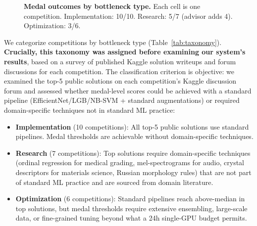 \documentclass{article}
\begin{document}
\begin{figure}[t]
    \caption{\textbf{Medal outcomes by bottleneck type.} Each cell is one competition. Implementation: 10/10. Research: 5/7 (advisor adds 4). Optimization: 3/6.}
    \label{fig:heatmap}
\end{figure}

We categorize competitions by bottleneck type (Table~\ref{tab:taxonomy}). \textbf{Crucially, this taxonomy was assigned before examining our system's results}, based on a survey of published Kaggle solution writeups and forum discussions for each competition. The classification criterion is objective: we examined the top-5 public solutions on each competition's Kaggle discussion forum and assessed whether medal-level scores could be achieved with a standard pipeline (EfficientNet/LGB/NB-SVM + standard augmentations) or required domain-specific techniques not in standard ML practice:
\begin{itemize}[leftmargin=1.5em,itemsep=1pt]
    \item \textbf{Implementation} (10 competitions): All top-5 public solutions use standard pipelines. Medal thresholds are achievable without domain-specific techniques.
    \item \textbf{Research} (7 competitions): Top solutions require domain-specific techniques (ordinal regression for medical grading, mel-spectrograms for audio, crystal descriptors for materials science, Russian morphology rules) that are not part of standard ML practice and are sourced from domain literature.
    \item \textbf{Optimization} (6 competitions): Standard pipelines reach above-median in top solutions, but medal thresholds require extensive ensembling, large-scale data, or fine-grained tuning beyond what a 24h single-GPU budget permits.
\end{itemize}
\end{document}
